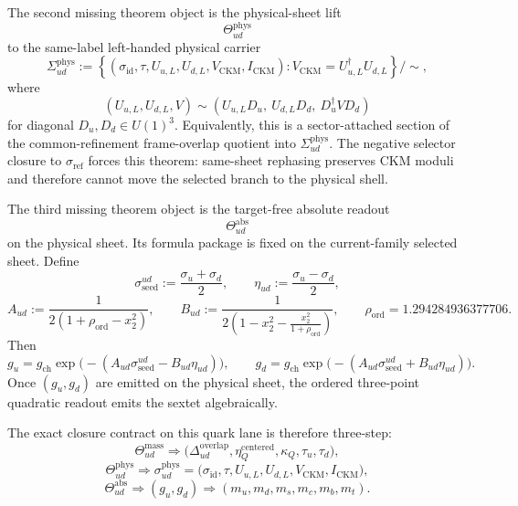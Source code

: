 \documentclass[11pt]{article}
\begin{document}
The second missing theorem object is the physical-sheet lift
\[
\Theta_{ud}^{\mathrm{phys}}
\]
to the same-label left-handed physical carrier
\[
\Sigma_{ud}^{\mathrm{phys}}
:=
\left\{
(\sigma_{\mathrm{id}},\tau,U_{u,L},U_{d,L},V_{\mathrm{CKM}},I_{\mathrm{CKM}})
:
V_{\mathrm{CKM}}=U_{u,L}^\dagger U_{d,L}
\right\}/\!\sim,
\]
where
\[
(U_{u,L},U_{d,L},V)\sim
(U_{u,L}D_u,\ U_{d,L}D_d,\ D_u^\dagger V D_d)
\]
for diagonal \(D_u,D_d\in U(1)^3\). Equivalently, this is a sector-attached section of the common-refinement frame-overlap quotient into \(\Sigma_{ud}^{\mathrm{phys}}\). The negative selector closure to \(\sigma_{\mathrm{ref}}\) forces this theorem: same-sheet rephasing preserves CKM moduli and therefore cannot move the selected branch to the physical shell.

The third missing theorem object is the target-free absolute readout
\[
\Theta_{ud}^{\mathrm{abs}}
\]
on the physical sheet. Its formula package is fixed on the current-family selected sheet. Define
\[
\sigma_{\mathrm{seed}}^{ud}:=\frac{\sigma_u+\sigma_d}{2},
\qquad
\eta_{ud}:=\frac{\sigma_u-\sigma_d}{2},
\]
\[
A_{ud}:=\frac{1}{2(1+\rho_{\mathrm{ord}}-x_2^2)},
\qquad
B_{ud}:=\frac{1}{2\!\left(1-x_2^2-\frac{x_2^2}{1+\rho_{\mathrm{ord}}}\right)},
\qquad
\rho_{\mathrm{ord}}=1.294284936377706.
\]
Then
\[
g_u
=
g_{\mathrm{ch}}
\exp\!\bigl(-(A_{ud}\sigma_{\mathrm{seed}}^{ud}-B_{ud}\eta_{ud})\bigr),
\qquad
g_d
=
g_{\mathrm{ch}}
\exp\!\bigl(-(A_{ud}\sigma_{\mathrm{seed}}^{ud}+B_{ud}\eta_{ud})\bigr).
\]
Once \((g_u,g_d)\) are emitted on the physical sheet, the ordered three-point quadratic readout emits the sextet algebraically.

The exact closure contract on this quark lane is therefore three-step:
\[
\Theta_{ud}^{\mathrm{mass}}
\Longrightarrow
\bigl(
\Delta_{ud}^{\mathrm{overlap}},
\eta_Q^{\mathrm{centered}},
\kappa_Q,
\tau_u,
\tau_d
\bigr),
\]
\[
\Theta_{ud}^{\mathrm{phys}}
\Longrightarrow
\sigma_{ud}^{\mathrm{phys}}
=
\bigl(\sigma_{\mathrm{id}},\tau,U_{u,L},U_{d,L},V_{\mathrm{CKM}},I_{\mathrm{CKM}}\bigr),
\]
\[
\Theta_{ud}^{\mathrm{abs}}
\Longrightarrow
(g_u,g_d)
\Longrightarrow
(m_u,m_d,m_s,m_c,m_b,m_t).
\]
\end{document}
